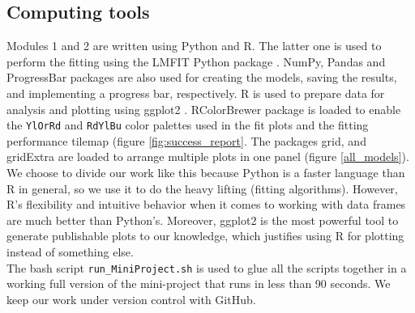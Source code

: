 \documentclass[titlepage,11pt]{article}
\begin{document}
\begin{linenumbers}
			\subsection{Computing tools}
			Modules 1 and 2 are written using Python and R. The latter one is used to perform the fitting using the LMFIT Python package \cite{Newville2014}. NumPy, Pandas \cite{Virtanen2020} and ProgressBar packages are also used for creating the models, saving the results, and implementing a progress bar, respectively. R is used to prepare data for analysis and plotting using ggplot2 \cite{Wickham2016}. RColorBrewer package is loaded to enable the \verb|YlOrRd| and \verb|RdYlBu| color palettes used in the fit plots and the fitting performance tilemap (figure \ref{fig:success_report}. The packages grid, and gridExtra are loaded to arrange multiple plots in one panel (figure \ref{all_models}).\\
			We choose to divide our work like this because Python is a faster language than R in general, so we use it to do the heavy lifting (fitting algorithms). However, R's flexibility and intuitive behavior when it comes to working with data frames are much better than Python's. Moreover, ggplot2 is the most powerful tool to generate publishable plots to our knowledge, which justifies using R for plotting instead of something else.\\
			The bash script \verb|run_MiniProject.sh| is used to glue all the scripts together in a working full version of the mini-project that runs in less than 90 seconds. We keep our work under version control with GitHub.
			

\end{linenumbers}
\end{document}
